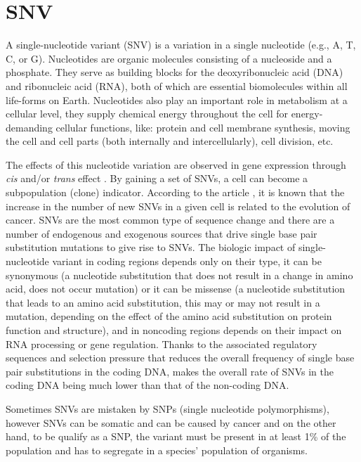 \section{SNV} %
\label{sec:snv}
\hspace{10px}A single-nucleotide variant (SNV) is a variation in a single nucleotide (e.g., A, T, C, or G). Nucleotides are organic molecules consisting of a nucleoside and a phosphate. They serve as building blocks for the deoxyribonucleic acid (DNA) and ribonucleic acid (RNA), both of which are essential biomolecules within all life-forms on Earth. Nucleotides also play an important role in metabolism at a cellular level, they supply chemical energy throughout the cell for energy-demanding cellular functions, like: protein and cell membrane synthesis, moving the cell and cell parts (both internally and intercellularly), cell division, etc\cite{Alberts}. 

The effects of this nucleotide variation are observed in gene expression through \textit{cis} and/or \textit{trans} effect \cite{Bryois,Zhu}. By gaining a set of SNVs, a cell can become a subpopulation (clone) indicator. According to the article \cite{Zhu}, it is known that the increase in the number of new SNVs in a given cell is related to the evolution of cancer. SNVs are the most common type of sequence change and there are a number of endogenous and exogenous sources that drive single base pair substitution mutations to give rise to SNVs. The biologic impact of single-nucleotide variant in coding regions depends only on their type, it can be synonymous (a nucleotide substitution that does not result in a change in amino acid, does not occur mutation) or it can be missense (a nucleotide substitution that leads to an amino acid substitution, this may or may not result in a mutation, depending on the effect of the amino acid substitution on protein function and structure), and in noncoding regions depends on their impact on RNA processing or gene regulation. Thanks to the associated regulatory sequences and \gls{selection pressure} that reduces the overall frequency of single base pair substitutions in the coding DNA, makes the overall rate of SNVs in the coding DNA being much lower than that of the non-coding DNA.

Sometimes SNVs are mistaken by SNPs (single nucleotide polymorphisms), however SNVs can be somatic and can be caused by cancer and on the other hand, to be qualify as a SNP, the variant must be present in at least 1\% of the population and has to \gls{segregate} in a species' population of organisms.


